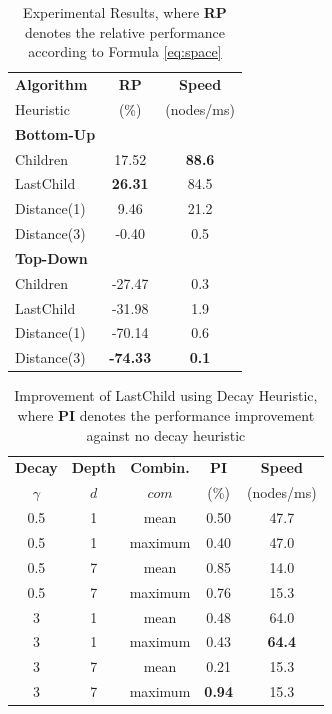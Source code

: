 \begin{table}[tb]
\centering
\caption{Experimental Results, where \textbf{RP} denotes the relative performance according to Formula \ref{eq:space}}
\label{tab:results}
\begin{tabular}{l c c}
\toprule
\textbf{Algorithm} & \textbf{RP} & \textbf{Speed}\\ 
Heuristic & (\%) & (nodes/ms)\\ 
\midrule

\textbf{Bottom-Up} & & \\
Children & 17.52 & \textbf{88.6} \\ 
LastChild & \textbf{26.31} & 84.5 \\ 
Distance(1) & 9.46 & 21.2 \\ 
Distance(3) & -0.40 & 0.5\\ 

\midrule

\textbf{Top-Down} & & \\
Children & -27.47 & 0.3 \\
LastChild & -31.98 & 1.9 \\
Distance(1) & -70.14 & 0.6 \\ 
Distance(3) & \textbf{-74.33} & \textbf{0.1}\\ 

\bottomrule
\end{tabular}
\end{table}

\begin{table}[t]
\centering

\caption{Improvement of LastChild using Decay Heuristic, where \textbf{PI} denotes the performance improvement against no decay heuristic}
\label{tab:decay}
\begin{tabular}{c c c c c}
\toprule
\textbf{Decay} & \textbf{Depth} &  \textbf{Combin.} & \textbf{PI} & \textbf{Speed}\\ 
$\gamma$ &$d$ &  $com$ &  (\%) & (nodes/ms)\\ 
\midrule
0.5&1& mean & 0.50 & 47.7\\ 
0.5& 1& maximum & 0.40 & 47.0 \\
0.5& 7& mean& 0.85 & 14.0 \\
0.5& 7& maximum & 0.76 & 15.3 \\
3&   1& mean & 0.48 & 64.0\\
3&   1& maximum & 0.43 & \textbf{64.4} \\
3&   7& mean & 0.21 & 15.3 \\ 
3&   7& maximum & \textbf{0.94} & 15.3 \\
\bottomrule
\end{tabular}
\end{table}

